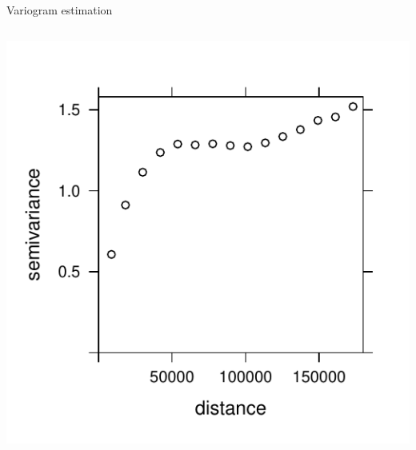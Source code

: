 \documentclass[
  ignorenonframetext,
]{beamer}
\begin{document}
\begin{frame}{Variogram estimation}
\begin{columns}[T]
\begin{column}{0.48\textwidth}
\includegraphics{Lecture_1_files/figure-beamer/unnamed-chunk-54-1.pdf}
\end{column}
\end{columns}
\end{frame}
\end{document}
